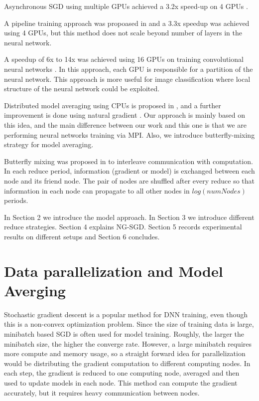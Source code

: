 \documentclass{article}
\begin{document}
Asynchronous SGD using multiple GPUs achieved a 3.2x speed-up on 4 GPUs \cite{zhang2013asynchronous}.

A pipeline training approach was propoased in \cite{chen2012pipelined} and a 3.3x speedup was achieved using 4 GPUs, but this
method does not scale beyond number of layers in the neural network.

A speedup of 6x to 14x was achieved using 16 GPUs on training convolutional neural networks \cite{coates2013deep}. In this approach,
each GPU is responsible for a partition of the neural network. This approach is more useful for image classification where 
local structure of the neural network could be exploited.

Distributed model averaging using CPUs is proposed in \cite{zhang2014improving}, and a further improvement 
is done using natural gradient \cite{povey2014parallel}. Our approach is mainly based on this idea, and the main 
difference between our work and this one is that we are performing neural networks training via MPI. Also,
we introduce butterfly-mixing strategy for model averaging.

Butterfly mixing was proposed in \cite{zhao2013butterfly} to interleave communication with computation. In each
reduce period, information (gradient or model) is exchanged between each node and its friend node. The pair of nodes
are shuffled after every reduce so that information in each node can propagate to all other nodes in 
$log(numNodes)$ periods.

In Section 2 we introduce the model approach. In Section 3 we introduce different reduce strategies. Section 4 
explains NG-SGD. Section 5 records experimental results on different setups and Section 6 concludes.

\section{Data parallelization and Model Averging}
Stochastic gradient descent is a popular method for DNN training, even though this is a non-convex optimization 
problem. Since the size of training data is large, minibatch based SGD is often used for model training. 
Roughly, the larger the minibatch size, the higher the converge rate. However, a large minibatch requires
more compute and memory usage, so a straight forward idea for parallelization would be distributing the 
gradient computation to different computing nodes. In each step, the gradient is reduced to one computing node,
averaged and then used to update models in each node. This method can compute the gradient accurately, but 
it requires heavy communication between nodes.
\end{document}
